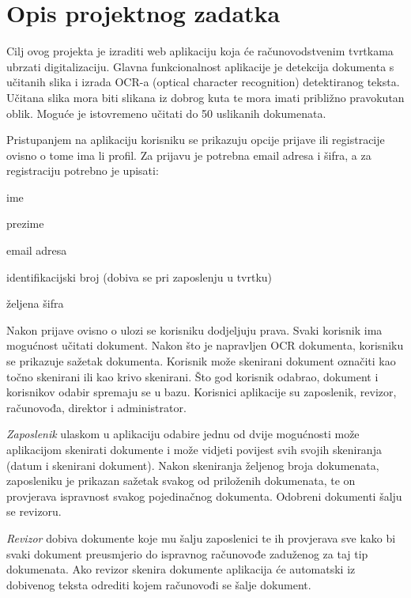 \chapter{Opis projektnog zadatka}
		
		Cilj ovog projekta je izraditi web aplikaciju koja će 
		računovodstvenim tvrtkama ubrzati digitalizaciju. Glavna funkcionalnost aplikacije je detekcija dokumenta
		s učitanih slika i izrada OCR-a (optical character recognition) detektiranog teksta. Učitana slika mora biti slikana iz dobrog kuta te mora imati približno pravokutan oblik. Moguće je istovremeno učitati do 50 uslikanih dokumenata.
		
		Pristupanjem na aplikaciju korisniku se prikazuju opcije prijave ili registracije ovisno o tome ima li profil. Za prijavu je potrebna email adresa i šifra, a za registraciju  potrebno je upisati:
		\begin{packed_item}
			\item {ime}
			\item {prezime}
			\item {email adresa}
			\item {identifikacijski broj (dobiva se pri zaposlenju u tvrtku)}
			\item {željena šifra}
		\end{packed_item}
		
		Nakon prijave ovisno o ulozi se korisniku dodjeljuju prava. Svaki korisnik ima mogućnost učitati dokument. Nakon što je napravljen OCR dokumenta, korisniku se prikazuje sažetak dokumenta. Korisnik može skenirani dokument označiti kao točno skenirani ili kao krivo skenirani. Što god korisnik odabrao, dokument i korisnikov odabir spremaju se u bazu.	Korisnici aplikacije su zaposlenik, revizor, računovođa, direktor i administrator.
		
		\textit {Zaposlenik} ulaskom u aplikaciju odabire jednu od dvije mogućnosti može aplikacijom skenirati dokumente i može vidjeti povijest svih svojih skeniranja (datum i skenirani dokument). Nakon skeniranja željenog broja dokumenata, zaposleniku je prikazan sažetak svakog od priloženih dokumenata, te on provjerava ispravnost svakog pojedinačnog dokumenta. Odobreni dokumenti šalju se revizoru. 
		
		\textit{Revizor} dobiva dokumente koje mu šalju zaposlenici te ih provjerava sve kako bi svaki dokument preusmjerio do ispravnog računovođe zaduženog za taj tip dokumenata. Ako revizor skenira dokumente aplikacija će automatski iz dobivenog teksta odrediti kojem računovođi se šalje dokument.
		
